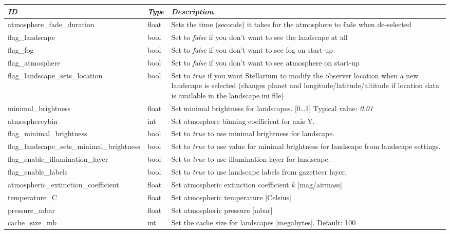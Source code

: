 \begin{longtabu} to \textwidth {l|l|X}\toprule
\emph{ID}                            & \emph{Type} & \emph{Description}\\\midrule
atmosphere\_fade\_duration                 & float & Sets the time (seconds) it takes for the atmosphere to fade when de-selected\\\midrule
flag\_landscape                            & bool  & Set to \emph{false} if you don't want to see the landscape at all\\\midrule
flag\_fog                                  & bool  & Set to \emph{false} if you don't want to see fog on start-up\\\midrule
flag\_atmosphere                           & bool  & Set to \emph{false} if you don't want to see atmosphere on start-up\\\midrule
flag\_landscape\_sets\_location            & bool  & Set to \emph{true} if you want Stellarium to modify the observer location 
                                                     when a new landscape is selected (changes planet and longitude/latitude/altitude 
                                                     if location data is available in the landscape.ini file)\\\midrule
minimal\_brightness                        & float & Set minimal brightness for landscapes. [0\ldots1] Typical value: \emph{0.01}\\\midrule
atmosphereybin						       & int   & Set atmosphere binning coefficient for axis Y.\\\midrule
flag\_minimal\_brightness                  & bool  & Set to \emph{true} to use minimal brightness for landscape.\\\midrule
flag\_landscape\_sets\_minimal\_brightness & bool  & Set to \emph{true} to use value for minimal brightness for landscape from landscape settings.\\\midrule
flag\_enable\_illumination\_layer          & bool  & Set to \emph{true} to use illumination layer for landscape.\\\midrule
flag\_enable\_labels                       & bool  & Set to \emph{true} to use landscape labels from gazetteer layer.\\\midrule
atmospheric\_extinction\_coefficient       & float & Set atmospheric extinction coefficient $k$ [mag/airmass]\\\midrule
temperature\_C                             & float & Set atmospheric temperature [Celsius]\\\midrule
pressure\_mbar                             & float & Set atmospheric pressure [mbar]\\\midrule
cache\_size\_mb                            & int   & Set the cache size for landscapes [megabytes]. Default: 100\\\bottomrule
\end{longtabu}

